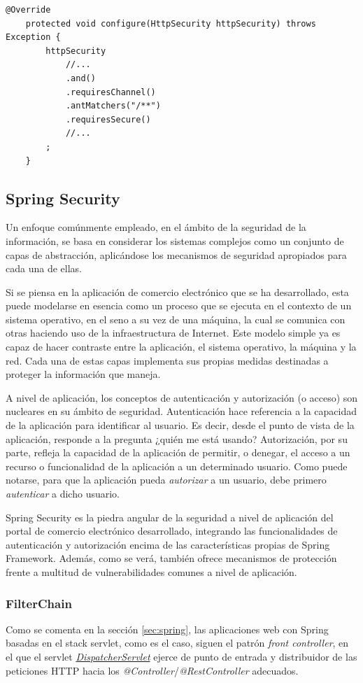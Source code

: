 \documentclass[a4paper]{article}
\begin{document}
	\begin{lstlisting}[caption=Configuración de Spring Security para imponer el uso de HTTPS,label=list:https]
	@Override
	protected void configure(HttpSecurity httpSecurity) throws Exception {
		httpSecurity
			//...
			.and()
			.requiresChannel()
			.antMatchers("/**")
			.requiresSecure()
			//...
		;
	}
	\end{lstlisting}
	
	\subsection{Spring Security} \label{sec:springsec}
	Un enfoque comúnmente empleado, en el ámbito de la seguridad de la información, se basa en considerar los sistemas complejos como un conjunto de capas de abstracción, aplicándose los mecanismos de seguridad apropiados para cada una de ellas.
	
	Si se piensa en la aplicación de comercio electrónico que se ha desarrollado, esta puede modelarse en esencia como un proceso que se ejecuta en el contexto de un sistema operativo, en el seno a su vez de una máquina, la cual se comunica con otras haciendo uso de la infraestructura de Internet. Este modelo simple ya es capaz de hacer contraste entre la aplicación, el sistema operativo, la máquina y la red. Cada una de estas capas implementa sus propias medidas destinadas a proteger la información que maneja.
	
	A nivel de aplicación, los conceptos de autenticación y autorización (o acceso) son nucleares en su ámbito de seguridad. Autenticación hace referencia a la capacidad de la aplicación para identificar al usuario. Es decir, desde el punto de vista de la aplicación, responde a la pregunta ¿quién me está usando? Autorización, por su parte, refleja la capacidad de la aplicación de permitir, o denegar, el acceso a un recurso o funcionalidad de la aplicación a un determinado usuario. Como puede notarse, para que la aplicación pueda \emph{autorizar} a un usuario, debe primero \emph{autenticar} a dicho usuario.
	
	Spring Security es la piedra angular de la seguridad a nivel de aplicación del portal de comercio electrónico desarrollado, integrando las funcionalidades de autenticación y autorización encima de las características propias de Spring Framework. Además, como se verá, también ofrece mecanismos de protección frente a multitud de vulnerabilidades comunes a nivel de aplicación.
	
	\subsubsection{FilterChain}
	Como se comenta en la sección \ref{sec:spring}, las aplicaciones web con Spring basadas en el stack servlet, como es el caso, siguen el patrón \emph{front controller}, en el que el servlet \href{https://docs.spring.io/spring/docs/current/spring-framework-reference/web.html#mvc-servlet}{\emph{DispatcherServlet}} ejerce de punto de entrada y distribuidor de las peticiones HTTP hacia los \emph{@Controller}/\emph{@RestController} adecuados.
	
\end{document}
